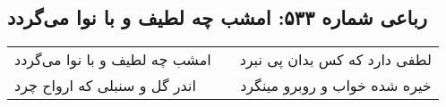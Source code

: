 \begin{center}
\section*{رباعی شماره ۵۳۳: امشب چه لطیف و با نوا می‌گردد}
\label{sec:0533}
\begin{longtable}{l p{0.5cm} r}
امشب چه لطیف و با نوا می‌گردد
&&
لطفی دارد که کس بدان پی نبرد
\\
اندر گل و سنبلی که ارواح چرد
&&
خیره شده خواب و روبرو مینگرد
\\
\end{longtable}
\end{center}
